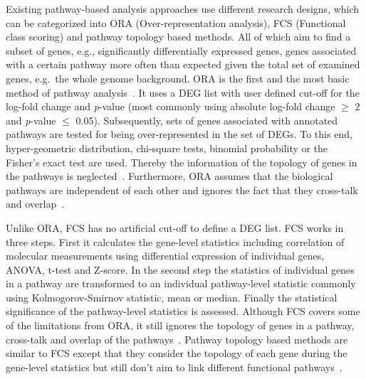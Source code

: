 \documentclass[10pt,a4paper,twocolumn]{article}
\begin{document}
Existing pathway-based analysis approaches use different research
designs, which can be categorized into ORA (Over-representation
analysis), FCS (Functional class scoring) and pathway topology based
methods. All of which aim to find a subset of genes, e.g.,
significantly differentially expressed genes, genes associated with a
certain pathway more often than expected given the total set of
examined genes, e.g.~the whole genome background. ORA is
the first and the most basic method of pathway analysis~\cite{Campos}. It uses a
DEG list with user defined cut-off for the log-fold change and
\textit{p}-value (most commonly using absolute log-fold change $\geq$
2 and \textit{p}-value $\leq$ 0.05). Subsequently, sets of genes
associated with annotated pathways are tested for being
over-represented in the set of DEGs. To this end, hyper-geometric
distribution, chi-square tests, binomial probability or the Fisher’s
exact test are used. Thereby the information of the topology of genes
in the pathways is neglected~\cite{Bayer}. Furthermore, ORA assumes
that the biological pathways are independent of each other and ignores
the fact that they cross-talk and overlap~\cite{Khatri2012,Campos}.

Unlike ORA, FCS has no artificial cut-off to define a DEG list. FCS works in
three steps. First it calculates the gene-level statistics including
correlation of molecular measurements using differential expression of
individual genes, ANOVA, t-test and Z-score. In the second step the
statistics of individual genes in a pathway are transformed to an
individual pathway-level statistic commonly using Kolmogorov-Smirnov
statistic, mean or median. Finally the statistical significance of the
pathway-level statistics is assessed. Although FCS covers some of the
limitations from ORA, it still ignores the topology of genes in a pathway,
cross-talk and overlap of the pathways~\cite{Khatri2012,Campos}. Pathway
topology based methods are similar to FCS except that they consider the
topology of each gene during the gene-level statistics but still don't aim
to link different functional pathways~\cite{Khatri2012}.
\end{document}
